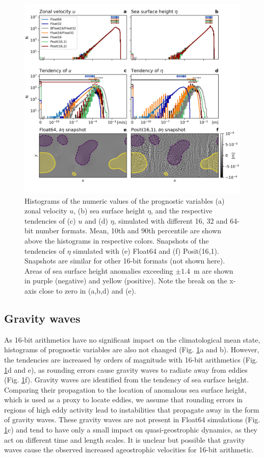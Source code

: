 \begin{figure}
\includegraphics[width=1\textwidth]{Figures/swm/tendency_hist2.png}
\caption{Histograms of the numeric values of the prognostic variables (a) zonal
velocity $u$, (b) sea surface height $\eta$, and the respective tendencies of
(c) $u$ and (d) $\eta$, simulated with different 16, 32
and 64-bit number formats. Mean, 10th and 90th percentile are shown above the
histograms in respective colors. Snapshots of the tendencies of $\eta$ simulated
with (e) Float64 and (f) Posit(16,1). Snapshots are similar for other 16-bit formats
(not shown here). Areas of sea surface height anomalies exceeding $\pm1.4$~m are
shown in purple (negative) and
yellow (positive). Note the break on the x-axis close to zero in (a,b,d) and (e).}
\label{fig:tend}
\end{figure}

\subsection{Gravity waves}

As 16-bit arithmetics have no significant impact on the climatological mean state,
histograms of prognostic variables are also not changed (Fig. \ref{fig:tend}a and b).
However, the tendencies are increased by orders of magnitude with 16-bit arithmetics
(Fig. \ref{fig:tend}d and e), as rounding errors cause gravity waves to radiate
away from eddies (Fig. \ref{fig:tend}f). Gravity waves are identified from the
tendency of sea surface height. Comparing their propagation to the location of
anomalous sea surface height, which is used as a proxy to locate eddies, we
assume that rounding errors in regions of high eddy activity lead to instabilities
that propagate away in the form of gravity waves. These gravity waves are not
present in Float64 simulations (Fig. \ref{fig:tend}c) and tend to have only a
small impact on quasi-geostrophic dynamics, as they act on different time and
length scales. It is unclear but possible that gravity waves cause the observed
increased ageostrophic velocities for 16-bit arithmetic.

